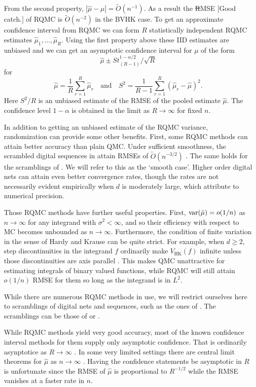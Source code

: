 \documentclass{article}
\newcommand{\art}[1]{\begingroup\color{blue}#1\endgroup}
\newcommand{\fred}[1]{\begingroup\color{red}#1\endgroup}
\renewcommand{\ge}{\geqslant}
\newcommand{\hk}{\mathrm{HK}}
\begin{document}
From the second property, $|\hat\mu-\mu|=\tilde O(n^{-1})$.
As a result the \fred{\sout{R}}MSE \art{[Good catch.]} of RQMC is $\tilde O(n^{-2})$
in the BVHK case.
To get an approximate confidence interval from RQMC
we can form $R$ statistically independent RQMC estimates
$\hat\mu_1,\dots,\hat\mu_R$. Using the first property
above these IID estimates are unbiased and we can get
an asymptotic confidence interval for $\mu$ of the form
$$
\hat\mu \pm S t_{(R-1)}^{1-\alpha/2}/\sqrt{R}
$$
for
$$
\hat\mu = \frac1R\sum_{r=1}^R\hat\mu_r
\quad\text{and}\quad
S^2 = \frac1{R-1}\sum_{r=1}^R(\hat\mu_r-\hat\mu)^2.
$$
Here $S^2/R$ is an unbiased estimate of the RMSE
of the pooled estimate $\hat\mu$.
The confidence level $1-\alpha$ is obtained in
the limit as $R\to\infty$ \cite{naka:tuff:2024}
for fixed $n$.

In addition to getting an unbiased estimate of
the RQMC variance, randomization can provide
some other benefits.  First, some RQMC methods
can attain better accuracy than plain QMC.
Under sufficient smoothness, the scrambled  digital sequences
in \cite{Owe95} attain RMSEs of $\tilde O(n^{-3/2})$
\cite{Owe97,Owe08a}. The same holds for the scramblings
of \cite{Mat98}. We will refer to this as the `smooth case'.
Higher order digital nets \cite{Dic11a} can attain even
better convergence rates, though the rates are not
necessarily evident empirically when $d$ is moderately
large, which \cite{nuyens2010higher} attribute to numerical precision.

Those RQMC methods have further
useful properties.  First,  $\operatorname{var}(\hat\mu) = o(1/n)$ as $n\to\infty$
for any integrand with $\sigma^2<\infty$, and so their
efficiency with respect to MC becomes unbounded as $n\to\infty$.
Furthermore, the condition of finite
variation in the sense of Hardy and Krause can be quite
strict. For example, when $d\ge2$, step discontinuities in the integrand
$f$ ordinarily make $V_{\hk}(f)$ infinite unless those discontinuities
are axis parallel \cite{Owe05a}. This makes QMC
unattractive for estimating integrals of binary
valued functions, while RQMC will still attain
$o(1/n)$ RMSE for them so long as the integrand
is in $L^2$.

While there are numerous RQMC methods in use, we
will restrict ourselves here to scramblings of digital nets
and sequences, such as the ones of \cite{Sob67}.
The scramblings can be those of \cite{Owe95} or
\cite{Mat98}.


While RQMC methods yield very good accuracy, most
of the known confidence interval methods for them
supply only asymptotic confidence. That is ordinarily
asynptotice as $R\to\infty$ \cite{naka:tuff:2024}.
In some very limited settings
there are central limit theorems for $\hat\mu$
as $n\to\infty$ \cite{Loh01}.
Having the confidence statements be asymptotic in $R$
is unfortunate since the RMSE of $\hat\mu$ 
is proportional to $R^{-1/2}$ while the RMSE
vanishes at a faster rate in $n$.
\end{document}

